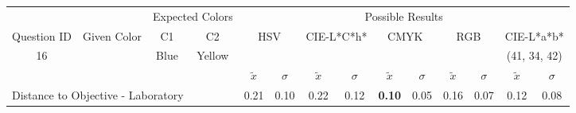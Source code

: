 \begin{table}[H]
  \resizebox{\textwidth}{!} {
  \begin{tabular}{lccccccccccccc}
    \hline
    \multicolumn{1}{c}{}                              &                                      & \multicolumn{2}{c}{Expected Colors}                   & \multicolumn{10}{c}{Possible Results}                                                                                                                                                                                                                                                                                        \\ \cline{3-14}
    \multicolumn{1}{c}{\multirow{-2}{*}{Question ID}} & \multirow{-2}{*}{Given Color}        & C1                       & C2                         & \multicolumn{2}{c}{HSV}                                        & \multicolumn{2}{c}{CIE-L*C*h*}                                 & \multicolumn{2}{c}{CMYK}                                       & \multicolumn{2}{c}{RGB}                                        & \multicolumn{2}{c}{CIE-L*a*b*}                                 \\ \hline
    \multicolumn{1}{c}{16}                             & \cellcolor[HTML]{FF007F}{\color[HTML]{FFFFFF}(45, 23, 22)} & \multicolumn{1}{c|}{Blue} & \multicolumn{1}{c|}{Yellow}  & \multicolumn{2}{c|}{\cellcolor[HTML]{FF007F}{\color[HTML]{FFFFFF}(45, 23, 22)}}      & \multicolumn{2}{c|}{\cellcolor[HTML]{FF0050}{\color[HTML]{FFFFFF}(43, 22, 10)}}       & \multicolumn{2}{c|}{\cellcolor[HTML]{808080}{\color[HTML]{FFFFFF}(21, 22, 24)}}       & \multicolumn{2}{c|}{\cellcolor[HTML]{808080}{\color[HTML]{FFFFFF}(21, 22, 24)}}       & \multicolumn{2}{c|}{\cellcolor[HTML]{CA8AAA}(41, 34, 42)}       \\ \hline
                                                      & \multicolumn{1}{l}{}                 & \multicolumn{1}{l}{}     & \multicolumn{1}{l}{}       & \multicolumn{1}{c}{$\tilde{x}$} & \multicolumn{1}{c}{$\sigma$} & \multicolumn{1}{c}{$\tilde{x}$} & \multicolumn{1}{c}{$\sigma$} & \multicolumn{1}{c}{$\tilde{x}$} & \multicolumn{1}{c}{$\sigma$} & \multicolumn{1}{c}{$\tilde{x}$} & \multicolumn{1}{c}{$\sigma$} & \multicolumn{1}{c}{$\tilde{x}$} & \multicolumn{1}{c}{$\sigma$} \\ \hline
    \multicolumn{4}{l}{Distance to Objective - Laboratory}                                                                                           & \multicolumn{1}{|c}{0.21}       & \multicolumn{1}{c|}{0.10}    & \multicolumn{1}{|c}{0.22}       & \multicolumn{1}{c|}{0.12}    & \multicolumn{1}{|c}{\textbf{0.10}}       & \multicolumn{1}{c|}{0.05}    & \multicolumn{1}{|c}{0.16}       & \multicolumn{1}{c|}{0.07}    & \multicolumn{1}{|c}{0.12}       & \multicolumn{1}{c|}{0.08}    \\

\end{tabular}}
\end{table}
